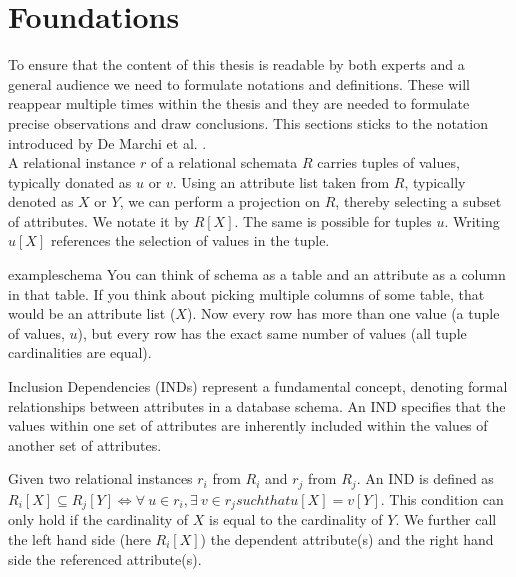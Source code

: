 \chapter{Foundations}

To ensure that the content of this thesis is readable by both experts and a general audience we need to formulate notations and definitions. These will reappear multiple times within the thesis and they are needed to formulate precise observations and draw conclusions. This sections sticks to the notation introduced by De Marchi et al. \cite{marchi2009unary}. \\

\noindent A relational instance $r$ of a relational schemata $R$ carries tuples of values, typically donated as $u$ or $v$. Using an attribute list taken from $R$, typically denoted as $X$ or $Y$, we can perform a projection on $R$, thereby selecting a subset of attributes. We notate it by $R[X]$. The same is possible for tuples $u$. Writing $u[X]$ references the selection of values in the tuple. \\

\begin{restatable}{example}{schema}\label{exmp:schema}
You can think of schema as a table and an attribute as a column in that table. If you think about picking multiple columns of some table, that would be an attribute list ($X$). Now every row has more than one value (a tuple of values, $u$), but every row has the exact same number of values (all tuple cardinalities are equal).
\end{restatable}

\noindent Inclusion Dependencies (INDs) represent a fundamental concept, denoting formal relationships between attributes in a database schema. An IND specifies that the values within one set of attributes are inherently included within the values of another set of attributes.

\begin{definition}\label{def:inds}
    Given two relational instances $r_i$ from $R_i$ and $r_j$ from $R_j$. An IND is defined as $R_i[X] \subseteq R_j[Y] \iff \forall \: u \in r_i, \exists \: v \in r_j such that u[X] = v[Y]$. This condition can only hold if the cardinality of $X$ is equal to the cardinality of $Y$. We further call the left hand side (here $R_i[X]$) the dependent attribute(s) and the right hand side the referenced attribute(s).
\end{definition}

